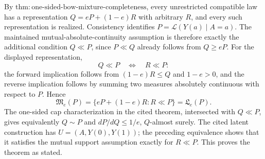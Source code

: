 By \(\mathrm{thm:one\text{-}sided\text{-}bow\text{-}mixture\text{-}completeness}\), every unrestricted compatible law has a representation \(Q=eP+(1-e)R\) with arbitrary \(R\), and every such representation is realized.  Consistency identifies \(P=\mathcal L(Y(a)\mid A=a)\).  The maintained mutual-absolute-continuity assumption is therefore exactly the additional condition \(Q\ll P\), since \(P\ll Q\) already follows from \(Q\ge eP\).  For the displayed representation,
\[
 Q\ll P\quad\Longleftrightarrow\quad R\ll P:
\]
the forward implication follows from \((1-e)R\le Q\) and \(1-e>0\), and the reverse implication follows by summing two measures absolutely continuous with respect to \(P\).  Hence
\[
 \mathfrak M_e(P)=\{eP+(1-e)R:R\ll P\}=\mathfrak L_e(P).
\]
The one-sided cap characterization in the cited theorem, intersected with \(Q\ll P\), gives equivalently \(Q\sim P\) and \(dP/dQ\le1/e\), \(Q\)-almost surely.  The cited latent construction has \(U=(A,Y(0),Y(1))\); the preceding equivalence shows that it satisfies the mutual support assumption exactly for \(R\ll P\).  This proves the theorem as stated.